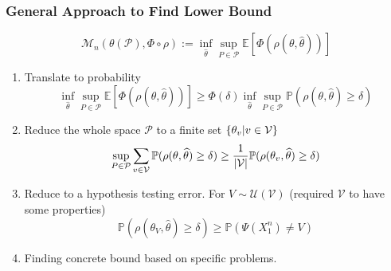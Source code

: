 \documentclass[10pt,xcolor={usenames,dvipsnames,table},aspectratio=169]{beamer}
\begin{document}
\begin{frame}
\frametitle{General Approach to Find Lower Bound}   

    \[
    \mathcal{M}_n(\theta(\mathcal{P}), \Phi \circ \rho) := \inf_{\widehat{\theta}} \sup_{P \in \mathcal{P}} \mathbb{E} \left[  \Phi(\rho(\theta, \widehat{\theta})) \right]
    \] 
    \begin{enumerate}
        \item Translate to probability
            \[
            \inf_{\widehat{\theta}} \sup_{P \in \mathcal{P}} \mathbb{E} \left[  \Phi(\rho(\theta, \widehat{\theta})) \right]
            \geq \Phi(\delta) \inf_{\widehat{\theta}} \sup_{P \in \mathcal{P}} \mathbb{P}(\rho(\theta, \widehat{\theta}) \geq \delta)
            \] 
        \item Reduce the whole space $ \mathcal{P}$ to a finite set $\left\{\theta_v| v \in \mathcal{V}\right\}$
            \[
            \sup_{P \in \mathcal{P}} \sum_{v \in \mathcal{V}} \mathbb{P}(\rho(\theta, \widehat{\theta}) \geq \delta) \geq \dfrac{1}{\left\lvert\mathcal{V}\right\rvert} \mathbb{P}(\rho(\theta_v, \widehat{\theta}) \geq \delta)
            \] 
        \item Reduce to a hypothesis testing error. For $V \sim \mathcal{U}(\mathcal{V})$ (required $\mathcal{V}$ to have some properties)
            \[
            \mathbb{P}(\rho(\theta_V, \widehat{\theta}) \geq \delta) \geq \mathbb{P}(\Psi(X_1^{n}) \neq V)
            \] 
        \item Finding concrete bound based on specific problems.

    \end{enumerate}
\end{frame}
\end{document}
